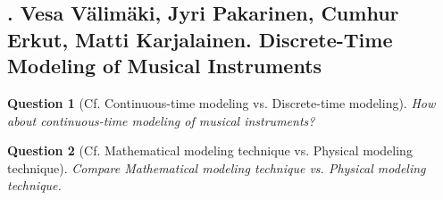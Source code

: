 \documentclass{article}
\newtheorem{question}{Question}
\begin{document}

\subsection{\cite{Valimaki_Pakarinen_Erkut_Karjalainen2006}. {\sc Vesa Välimäki, Jyri Pakarinen, Cumhur Erkut, Matti Karjalainen}. Discrete-Time Modeling of Musical Instruments}
{\sf[283 citations]}
\begin{question}[Cf. Continuous-time modeling vs. Discrete-time modeling]
	How about continuous-time modeling of musical instruments?
\end{question}

\begin{question}[Cf. Mathematical modeling technique vs. Physical modeling technique]
	Compare Mathematical modeling technique vs. Physical modeling technique.
\end{question}
\end{document}
